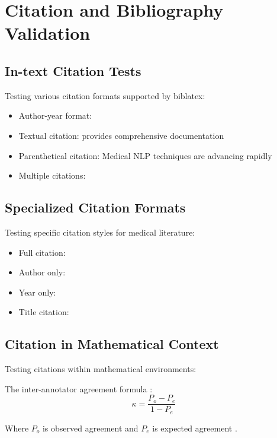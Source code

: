 \documentclass[11pt,a4paper]{article}
\begin{document}
\section{Citation and Bibliography Validation}

\subsection{In-text Citation Tests}
Testing various citation formats supported by biblatex:

\begin{itemize}
    \item Author-year format: \cite{bratstandards2024}
    \item Textual citation: \textcite{xelatex2024} provides comprehensive documentation
    \item Parenthetical citation: Medical NLP techniques \parencite{annotation2023} are advancing rapidly
    \item Multiple citations: \cite{bratstandards2024,xelatex2024,annotation2023}
\end{itemize}

\subsection{Specialized Citation Formats}
Testing specific citation styles for medical literature:

\begin{itemize}
    \item Full citation: 
    \item Author only: \citeauthor{annotation2023}
    \item Year only: \citeyear{xelatex2024}
    \item Title citation: 
\end{itemize}

\subsection{Citation in Mathematical Context}
Testing citations within mathematical environments:

The inter-annotator agreement formula \cite{bratstandards2024}:
\begin{equation}
\kappa = \frac{P_o - P_e}{1 - P_e}
\end{equation}

Where $P_o$ is observed agreement and $P_e$ is expected agreement \parencite{annotation2023}.
\end{document}
